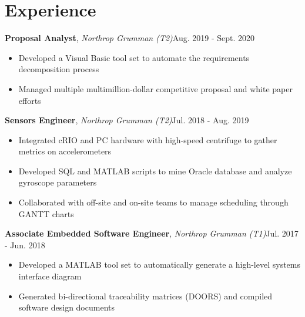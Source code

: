 \documentclass[12pt]{article}
\newcommand\firstboxx[2]{\textbf{\fontsize{12.8}{15}\selectfont #1}, \textit{#2}}
\newcommand{\itemheader}[3]{\firstboxx{#1}{#2}\hfill#3}
\begin{document}
\section*{Experience}
\vspace*{-1em}\makebox[\linewidth]{\rule{\textwidth}{0.4pt}}

\itemheader{Proposal Analyst}{Northrop Grumman (T2)}{Aug. 2019 - Sept. 2020}
\begin{itemize}
\item Developed a Visual Basic tool set to automate the requirements decomposition process
\item Managed multiple multimillion-dollar competitive proposal and white paper efforts
\end{itemize}

\bigskip
\itemheader{Sensors Engineer}{Northrop Grumman (T2)}{Jul. 2018 - Aug. 2019}
\begin{itemize}
\item Integrated cRIO and PC hardware with high-speed centrifuge to gather metrics on accelerometers
\item Developed SQL and MATLAB scripts to mine Oracle database and analyze gyroscope parameters
\item Collaborated with off-site and on-site teams to manage scheduling through GANTT charts
\end{itemize}

\bigskip
\itemheader{Associate Embedded Software Engineer}{Northrop Grumman (T1)}{Jul. 2017 - Jun. 2018}
\begin{itemize}
\item Developed a MATLAB tool set to automatically generate a high-level systems interface diagram 
\item Generated bi-directional traceability matrices (DOORS) and compiled software design documents
\end{itemize}
\end{document}
